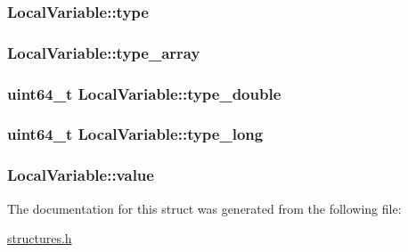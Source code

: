 \subsubsection[{\texorpdfstring{type}{type}}]{ Local\+Variable\+::type}\hypertarget{structLocalVariable_a05438f40d41a69cde0a4d50a37bf9420}{}\label{structLocalVariable_a05438f40d41a69cde0a4d50a37bf9420}
\subsubsection[{\texorpdfstring{type\+\_\+array}{type_array}}]{ Local\+Variable\+::type\+\_\+array}\hypertarget{structLocalVariable_a6905d4b07d1ff41deaa0189ae8761850}{}\label{structLocalVariable_a6905d4b07d1ff41deaa0189ae8761850}
\subsubsection[{\texorpdfstring{type\+\_\+double}{type_double}}]{\setlength{\rightskip}{0pt plus 5cm}uint64\+\_\+t Local\+Variable\+::type\+\_\+double}\hypertarget{structLocalVariable_a488dfde0ac92dbb3f2b4d56280771141}{}\label{structLocalVariable_a488dfde0ac92dbb3f2b4d56280771141}
\subsubsection[{\texorpdfstring{type\+\_\+long}{type_long}}]{\setlength{\rightskip}{0pt plus 5cm}uint64\+\_\+t Local\+Variable\+::type\+\_\+long}\hypertarget{structLocalVariable_af14e5709d8a7c9397571316821b9171b}{}\label{structLocalVariable_af14e5709d8a7c9397571316821b9171b}
\subsubsection[{\texorpdfstring{value}{value}}]{ Local\+Variable\+::value}\hypertarget{structLocalVariable_aee58138d840bf24f71cd8c4fd2f84db7}{}\label{structLocalVariable_aee58138d840bf24f71cd8c4fd2f84db7}


The documentation for this struct was generated from the following file\+:\begin{DoxyCompactItemize}
\item 
\hyperlink{structures_8h}{structures.\+h}\end{DoxyCompactItemize}
